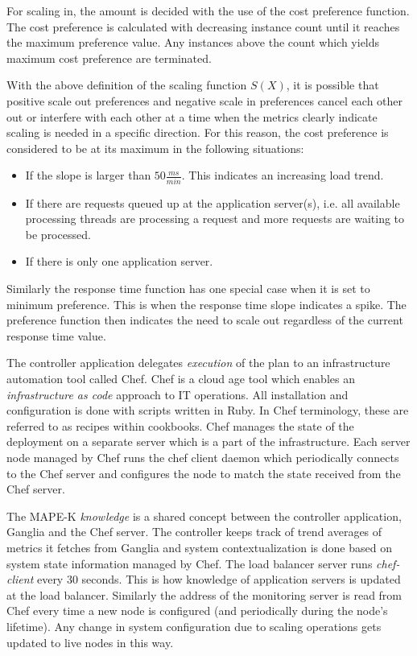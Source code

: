 \documentclass[english]{tktltiki2}
\theoremstyle{definition}
\theoremstyle{remark}
\begin{document}
For scaling in, the amount is decided with the use of the cost preference
function. The cost preference is calculated with decreasing instance count until
it reaches the maximum preference value. Any instances above the count which
yields maximum cost preference are terminated.

With the above definition of the scaling function $S(X)$, it is possible that
positive scale out preferences and negative scale in preferences cancel each
other out or interfere with each other at a time when the metrics clearly indicate scaling is needed in a specific direction. For this reason, the cost preference is considered to be at its maximum in the following situations:

\begin{itemize}
	\item{If the slope is larger than $50 \frac{ms}{min}$. This indicates an increasing load trend.}
	\item{If there are requests queued up at the application server(s), i.e. all available processing threads are processing a request and more requests are waiting to be processed.}
	\item{If there is only one application server.}
\end{itemize}

Similarly the response time function has one special case when it is set to minimum preference. This is when the response time slope indicates a spike. The preference function then indicates the need to scale out regardless of the current response time value.

The controller application delegates \textit{execution} of the plan to an
infrastructure automation tool called Chef. Chef is a cloud age tool which
enables an \textit{infrastructure as code} approach to IT operations. All
installation and configuration is done with scripts written in Ruby. In Chef
terminology, these are referred to as recipes within cookbooks. Chef manages the
state of the deployment on a separate server which is a part of the
infrastructure. Each server node managed by Chef runs the chef client daemon
which periodically connects to the Chef server and configures the node to match
the state received from the Chef server.

The MAPE-K \textit{knowledge} is a shared concept between the controller
application, Ganglia and the Chef server. The controller keeps track of trend
averages of metrics it fetches from Ganglia and system contextualization is done
based on system state information managed by Chef. The load balancer server runs
\textit{chef-client} every 30 seconds. This is how knowledge of application
servers is updated at the load balancer. Similarly the address of the monitoring
server is read from Chef every time a new node is configured (and periodically
during the node's lifetime). Any change in system configuration due to scaling
operations gets updated to live nodes in this way.
\end{document}

